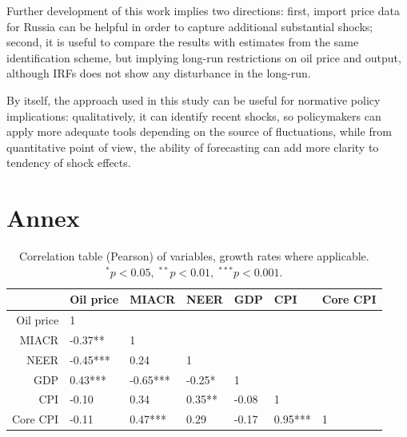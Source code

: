 \documentclass[12pt, a4paper]{extarticle}
\begin{document}
Further development of this work implies two directions: first, import price data for Russia can be helpful in order to capture additional substantial shocks; second, it is useful to compare the results with estimates from the same identification scheme, but implying long-run restrictions on oil price and output, although IRFs does not show any disturbance in the long-run. 

By itself, the approach used in this study can be useful for normative policy implications: qualitatively, it can identify recent shocks, so policymakers can apply more adequate tools depending on the source of fluctuations, while from quantitative point of view, the ability of forecasting can add more clarity to tendency of shock effects.

\renewcommand*{\newblockpunct}{\addperiod\space\bibsentence}
\newpage
\linespread{1.3}

\printbibliography
{}
\newpage
\setcounter{figure}{0}
\setcounter{table}{0}
\makeatletter
\renewcommand*{\thetable}{\alph{table}}
\renewcommand*{\thefigure}{\alph{figure}}
\let\c@table\c@figure
\makeatother 

\section*{Annex}
\label{app}

\begin{table}[h!]
\centering
	\begin{tabular}{@{}rllllll@{}}
	  \toprule
	 & Oil price & MIACR & NEER & GDP & CPI & Core CPI\\ 
	  \midrule
	 	Oil price & 1 &  &  &  & &\\ 
  		MIACR& -0.37**  & 1 &  &  & &\\ 
  		NEER & -0.45*** & 0.24  &  1  & & &\\ 
  		GDP &  0.43***  &  -0.65*** & -0.25* & 1 & &\\ 
  		CPI & -0.10  & 0.34  &  0.35** &  -0.08 & 1 &\\ 
  		Core CPI &-0.11&0.47***&0.29&-0.17&0.95***&1\\
	   \bottomrule
	\end{tabular}
	\caption{Correlation table (Pearson) of variables, growth rates where applicable.\\ $^*p<0.05,\; ^{**}p<0.01,\;^{***}p<0.001$.}
	\label{table:correlation_variables}
\end{table}
\end{document}
